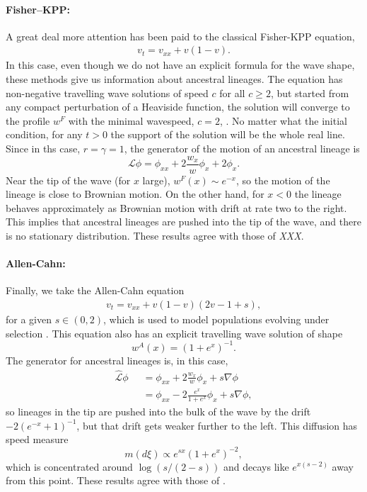 \documentclass[12pt]{article}
\def \hat{\widehat}
\newcommand{\Lgen}{\mathcal{L}}    %
\newcommand{\comment}[1]{{\color{blue} \it #1}}
\begin{document}
\paragraph{Fisher--KPP:}
A great deal more attention has been paid to the classical Fisher-KPP equation,
\begin{align} \label{eqn:fkpp}
    v_t = v_{xx} + v (1-v) .
\end{align}
In this case,
even though we do not have an explicit formula for the wave shape,
these methods give us information about ancestral lineages.
The equation has non-negative travelling wave solutions of speed $c$ for all $c \geq 2$, 
but started from any compact perturbation of a Heaviside function, the 
solution will converge to the profile $w^F$ with the minimal wavespeed, $c=2$,
\cite{kolmogorov/petrovsky/piscounov:1937,bramson:1983}.
No matter what the initial condition,
for any $t>0$ the support of the 
solution will be the whole real line. 
Since in ths case, $r = \gamma = 1$,
the generator of the motion of an ancestral lineage is
$$
    \Lgen \phi
    =
    \phi_{xx} + 2 \frac{w_x}{w} \phi_x + 2 \phi_x .
$$
Near the tip of the wave (for $x$ large), $w^F(x) \sim e^{-x}$,
so the motion of the lineage is close to Brownian motion.
On the other hand, for $x < 0$ the lineage behaves approximately as
Brownian motion with drift at rate two to the right.
This implies that
ancestral lineages are pushed into the tip of the wave,
and there is no stationary distribution.
These results agree with those of \comment{XXX}.


\paragraph{Allen-Cahn:}
Finally, we take the Allen-Cahn equation
\begin{align} \label{eqn:allen_cahn}
    v_t = v_{xx} + v(1-v)(2v-1+s),
\end{align}
for a given $s \in (0,2)$,
which is used to model populations evolving under selection \cite{Sarah}.
This equation also has an explicit travelling wave solution
of shape
\[ w^A(x) = (1+e^{x})^{-1}. \]
The generator for ancestral lineages is, in this case,
\begin{align*}
    \hat{\mathcal{L}}\phi
    &=
    \phi_{xx}
    + 
    2 \frac{w_x}{w} \phi_x
    +
    s \nabla \phi \\
    \qquad &=
    \phi_{xx}
    -
    2 \frac{e^x}{1+e^x} \phi_x 
    + 
    s \nabla \phi,
\end{align*}
so lineages in the tip are pushed into the bulk of the wave by the drift $-2(e^{-x}+1)^{-1}$,
but that drift gets weaker further to the left.
This diffusion has speed measure
$$
    m(d\xi) \propto e^{sx}(1+e^x)^{-2},
$$
which is concentrated around $\log(s/(2-s))$ and decays like $e^{x(s-2)}$ away from this point.
These results agree with those of \cite{etheridge/penington:2020}.
\end{document}
